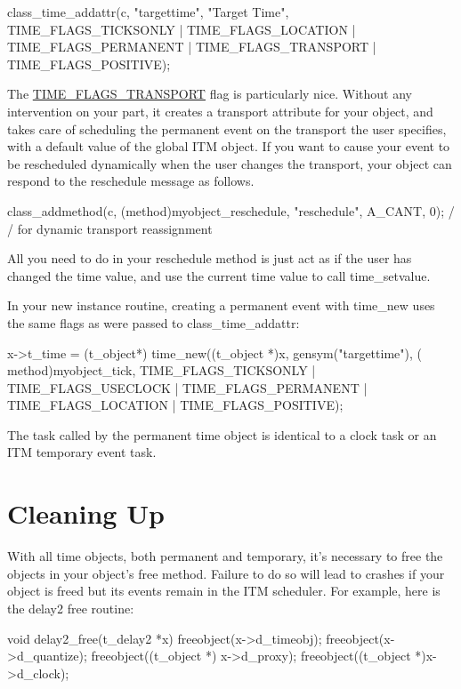 \begin{DoxyCode}
    class_time_addattr(c, "targettime", "Target Time", TIME_FLAGS_TICKSONLY | 
      TIME_FLAGS_LOCATION | TIME_FLAGS_PERMANENT | TIME_FLAGS_TRANSPORT | 
      TIME_FLAGS_POSITIVE);
\end{DoxyCode}


The \hyperlink{group__time_gga99fb83031ce9923c84392b4e92f956b5a7ddd9e0fa3dc6a7b346fc3dcee5c5c81}{TIME\_\-FLAGS\_\-TRANSPORT} flag is particularly nice. Without any intervention on your part, it creates a transport attribute for your object, and takes care of scheduling the permanent event on the transport the user specifies, with a default value of the global ITM object. If you want to cause your event to be rescheduled dynamically when the user changes the transport, your object can respond to the reschedule message as follows.


\begin{DoxyCode}
    class_addmethod(c, (method)myobject_reschedule, "reschedule",   A_CANT, 0);         /
      / for dynamic transport reassignment
\end{DoxyCode}


All you need to do in your reschedule method is just act as if the user has changed the time value, and use the current time value to call time\_\-setvalue.

In your new instance routine, creating a permanent event with time\_\-new uses the same flags as were passed to class\_\-time\_\-addattr:


\begin{DoxyCode}
    x->t_time = (t_object*) time_new((t_object *)x, gensym("targettime"), (
      method)myobject_tick, TIME_FLAGS_TICKSONLY | TIME_FLAGS_USECLOCK | 
      TIME_FLAGS_PERMANENT | TIME_FLAGS_LOCATION | TIME_FLAGS_POSITIVE);
\end{DoxyCode}


The task called by the permanent time object is identical to a clock task or an ITM temporary event task.\hypertarget{chapter_itm_chapter_itm_clean}{}\section{Cleaning Up}\label{chapter_itm_chapter_itm_clean}
With all time objects, both permanent and temporary, it's necessary to free the objects in your object's free method. Failure to do so will lead to crashes if your object is freed but its events remain in the ITM scheduler. For example, here is the delay2 free routine:


\begin{DoxyCode}
    void delay2_free(t_delay2 *x)
    {
        freeobject(x->d_timeobj);
        freeobject(x->d_quantize);
        freeobject((t_object *) x->d_proxy);
        freeobject((t_object *)x->d_clock);
    }
\end{DoxyCode}
 